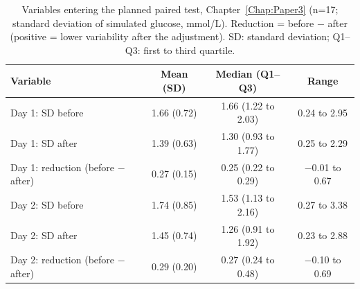 \begin{table}[htbp]
\centering
\small
\caption{Variables entering the planned paired test, Chapter~\ref{Chap:Paper3} (n=17; standard deviation of simulated glucose, mmol/L). Reduction = before $-$ after (positive = lower variability after the adjustment). SD: standard deviation; Q1--Q3: first to third quartile.}
\label{tab:app_powertest_ch6}
\begin{tabular}{|l|c|c|c|}
\hline
\textbf{Variable} & \textbf{Mean (SD)} & \textbf{Median (Q1--Q3)} & \textbf{Range} \\
\hline
Day 1: SD before & 1.66 (0.72) & 1.66 (1.22 to 2.03) & 0.24 to 2.95 \\
Day 1: SD after & 1.39 (0.63) & 1.30 (0.93 to 1.77) & 0.25 to 2.29 \\
Day 1: reduction (before $-$ after) & 0.27 (0.15) & 0.25 (0.22 to 0.29) & $-$0.01 to 0.67 \\
Day 2: SD before & 1.74 (0.85) & 1.53 (1.13 to 2.16) & 0.27 to 3.38 \\
Day 2: SD after & 1.45 (0.74) & 1.26 (0.91 to 1.92) & 0.23 to 2.88 \\
Day 2: reduction (before $-$ after) & 0.29 (0.20) & 0.27 (0.24 to 0.48) & $-$0.10 to 0.69 \\
\hline
\end{tabular}
\end{table}
